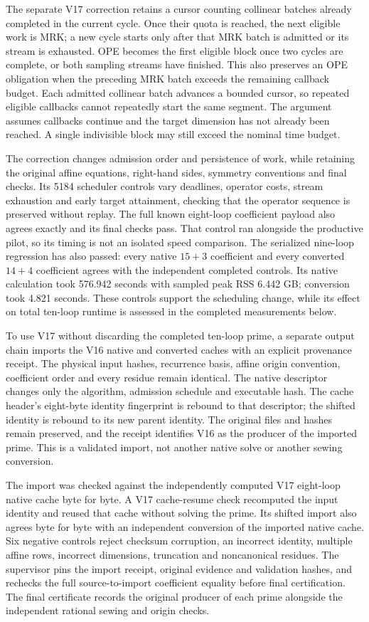 \documentclass[11pt]{article}
\begin{document}
The separate V17 correction retains a cursor counting collinear batches
already completed in the current cycle. Once their quota is reached, the
next eligible work is MRK; a new cycle starts only after that MRK batch is
admitted or its stream is exhausted. OPE becomes the first eligible block
once two cycles are complete, or both sampling streams have finished.
This also preserves an OPE obligation when the preceding MRK batch exceeds
the remaining callback budget. Each admitted collinear batch advances a
bounded cursor, so repeated eligible callbacks cannot repeatedly start
the same segment. The argument assumes callbacks continue and the target
dimension has not already been reached. A single indivisible block may
still exceed the nominal time budget.

The correction changes admission order and persistence of work, while
retaining the original affine equations, right-hand sides, symmetry
conventions and final checks. Its 5184 scheduler controls vary deadlines,
operator costs, stream exhaustion and early target attainment, checking
that the operator sequence is preserved without replay. The full known
eight-loop coefficient payload also agrees exactly and its final checks
pass. That control ran alongside the productive pilot, so its timing is
not an isolated speed comparison. The serialized nine-loop regression has
also passed: every native $15+3$ coefficient and every converted $14+4$
coefficient agrees with the independent completed controls. Its native
calculation took 576.942 seconds with sampled peak RSS 6.442 GB; conversion
took 4.821 seconds. These controls support the scheduling change, while its
effect on total ten-loop runtime is assessed in the completed measurements below.

To use V17 without discarding the completed ten-loop prime, a separate
output chain imports the V16 native and converted caches with an explicit
provenance receipt. The physical input hashes, recurrence basis, affine
origin convention, coefficient order and every residue remain identical.
The native descriptor changes only the algorithm, admission schedule and
executable hash. The cache header's eight-byte identity fingerprint is
rebound to that descriptor; the shifted identity is rebound to its new
parent identity. The original files and hashes remain preserved, and the
receipt identifies V16 as the producer of the imported prime. This is a
validated import, not another native solve or another sewing conversion.

The import was checked against the independently computed V17 eight-loop
native cache byte for byte. A V17 cache-resume check recomputed the input
identity and reused that cache without solving the prime. Its shifted
import also agrees byte for byte with an independent conversion of the
imported native cache. Six negative controls reject checksum corruption,
an incorrect identity, multiple affine rows, incorrect dimensions,
truncation and noncanonical residues. The supervisor pins the import
receipt, original evidence and validation hashes, and rechecks the full
source-to-import coefficient equality before final certification. The
final certificate records the original producer of each prime alongside
the independent rational sewing and origin checks.
\end{document}

